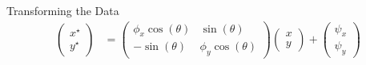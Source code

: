 \documentclass[final]{beamer}
\newlength{\onecolwid}
\begin{document}
\begin{frame}[t]
\begin{columns}[t]
\begin{column}{\onecolwid}
\begin{block}{Transforming the Data}
\begin{align*}
  \begin{pmatrix}
    x^{\star} \\
    y^{\star}
\end{pmatrix} &= \begin{pmatrix}
\phi_{x}\cos(\theta) & \sin(\theta)\\
-\sin(\theta) & \phi_{y}\cos(\theta)
\end{pmatrix}  \begin{pmatrix}
    x \\
    y
\end{pmatrix} +   \begin{pmatrix}
    \psi_{x} \\
    \psi_{y}
\end{pmatrix}
\end{align*}



\end{block}
\end{column}
\end{columns}
\end{frame}
\end{document}
